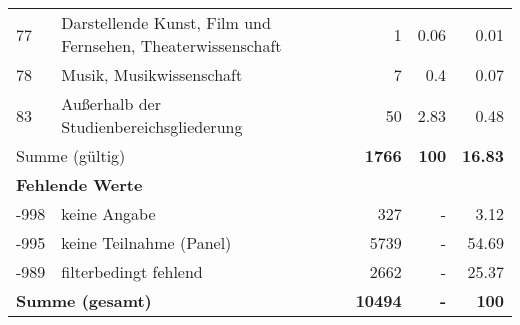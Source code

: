 \begin{longtable}{lXrrr}
        77 & \multicolumn{1}{X}{Darstellende Kunst, Film und Fernsehen, Theaterwissenschaft} & %
          \num{1} &
          \num[round-mode=places,round-precision=2]{0,06} &
          \num[round-mode=places,round-precision=2]{0,01} \\

        78 & \multicolumn{1}{X}{Musik, Musikwissenschaft} & %
          \num{7} &
          \num[round-mode=places,round-precision=2]{0,4} &
          \num[round-mode=places,round-precision=2]{0,07} \\

        83 & \multicolumn{1}{X}{Außerhalb der Studienbereichsgliederung} & %
          \num{50} &
          \num[round-mode=places,round-precision=2]{2,83} &
          \num[round-mode=places,round-precision=2]{0,48} \\

     \midrule
     \multicolumn{2}{l}{Summe (gültig)} &
       \textbf{\num{1766}} &
     \textbf{100} &
       \textbf{\num[round-mode=places,round-precision=2]{16,83}} \\
     \multicolumn{5}{l}{\textbf{Fehlende Werte}}\\
       -998 &
       keine Angabe &
         \num{327} &
        - &
         \num[round-mode=places,round-precision=2]{3,12} \\
       -995 &
       keine Teilnahme (Panel) &
         \num{5739} &
        - &
         \num[round-mode=places,round-precision=2]{54,69} \\
       -989 &
       filterbedingt fehlend &
         \num{2662} &
        - &
         \num[round-mode=places,round-precision=2]{25,37} \\
     \midrule
     \multicolumn{2}{l}{\textbf{Summe (gesamt)}} &
          \textbf{\num{10494}} &
        \textbf{-} &
        \textbf{100} \\
     \bottomrule
     \end{longtable}
     
